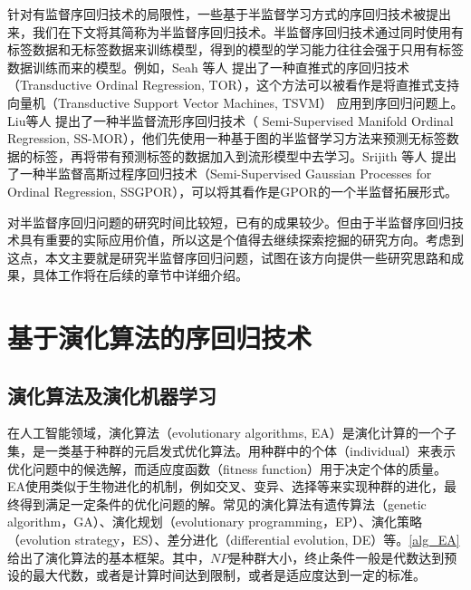针对有监督序回归技术的局限性，一些基于半监督学习方式的序回归技术被提出来，我们在下文将其简称为半监督序回归技术。半监督序回归技术通过同时使用有标签数据和无标签数据来训练模型，得到的模型的学习能力往往会强于只用有标签数据训练而来的模型。例如，Seah 等人\citep{seah2012transductive}
提出了一种直推式的序回归技术（Transductive Ordinal Regression, TOR），这个方法可以被看作是将直推式支持向量机（Transductive Support Vector Machines, TSVM\citep{joachims1999transductive}）
应用到序回归问题上。Liu等人\citep{liu2011semi}
提出了一种半监督流形序回归技术（ Semi-Supervised Manifold Ordinal Regression, SS-MOR），他们先使用一种基于图的半监督学习方法来预测无标签数据的标签，再将带有预测标签的数据加入到流形模型中去学习。Srijith 等人\citep{srijith2013semi}
提出了一种半监督高斯过程序回归技术（Semi-Supervised Gaussian Processes for Ordinal Regression, SSGPOR），可以将其看作是GPOR\citep{chu2005gaussian}的一个半监督拓展形式。

对半监督序回归问题的研究时间比较短，已有的成果较少。但由于半监督序回归技术具有重要的实际应用价值，所以这是个值得去继续探索挖掘的研究方向。考虑到这点，本文主要就是研究半监督序回归问题，试图在该方向提供一些研究思路和成果，具体工作将在后续的章节中详细介绍。 

\section{基于演化算法的序回归技术}

\subsection{演化算法及演化机器学习}

在人工智能领域，演化算法（evolutionary algorithms, EA）\citep{back1996evolutionary}是演化计算的一个子集，是一类基于种群的元启发式优化算法。用种群中的个体（individual）来表示优化问题中的候选解，而适应度函数（fitness function）用于决定个体的质量。EA使用类似于生物进化的机制，例如交叉、变异、选择等来实现种群的进化，最终得到满足一定条件的优化问题的解。常见的演化算法有遗传算法（genetic algorithm，GA）、演化规划（evolutionary programming，EP）、演化策略（evolution strategy，ES）、差分进化（differential evolution, DE）等。\autoref{alg_EA}给出了演化算法的基本框架。其中，\(NP\)是种群大小，终止条件一般是代数达到预设的最大代数，或者是计算时间达到限制，或者是适应度达到一定的标准。

